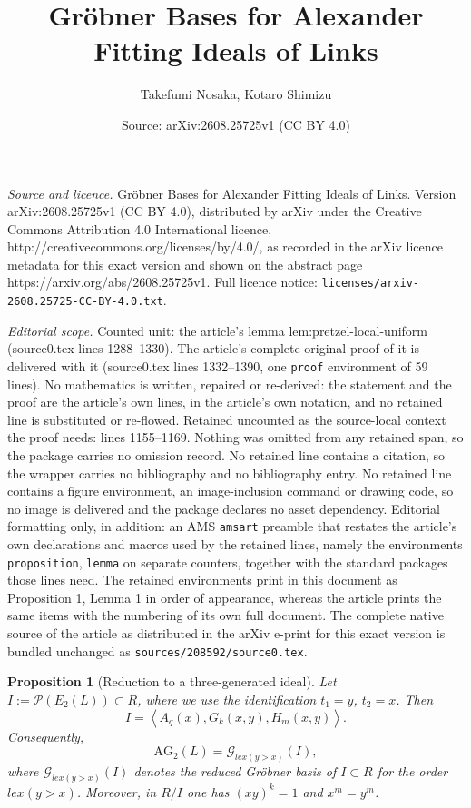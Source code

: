 \documentclass[10pt,a4paper]{amsart}
\title{Gr\"obner Bases for Alexander Fitting Ideals of Links}
\author{Takefumi Nosaka, Kotaro Shimizu}
\date{Source: arXiv:2608.25725v1 (CC BY 4.0)}
\newtheorem{proposition}{Proposition}
\newcommand{\AG}{\mathrm{AG}}
\newcommand{\PP}{\mathcal{P}}
\newcommand{\ideal}[1]{\left\langle #1 \right\rangle}
\newcommand{\lex}{lex}
\begin{document}
\maketitle

\noindent\emph{Source and licence.} Gr\"obner Bases for Alexander Fitting Ideals of Links. Version arXiv:2608.25725v1 (CC BY 4.0), distributed by arXiv under the Creative Commons Attribution 4.0 International licence, http://creativecommons.org/licenses/by/4.0/, as recorded in the arXiv licence metadata for this exact version and shown on the abstract page https://arxiv.org/abs/2608.25725v1. Full licence notice: \texttt{licenses/arxiv-2608.25725-CC-BY-4.0.txt}.\par\smallskip

\noindent\textit{Editorial scope.} Counted unit: the article's lemma lem:pretzel-local-uniform (source0.tex lines 1288--1330). The article's complete original proof of it is delivered with it (source0.tex lines 1332--1390, one \texttt{proof} environment of 59 lines). No mathematics is written, repaired or re-derived: the statement and the proof are the article's own lines, in the article's own notation, and no retained line is substituted or re-flowed.  Retained uncounted as the source-local context the proof needs: lines 1155--1169.  Nothing was omitted from any retained span, so the package carries no omission record.  No retained line contains a citation, so the wrapper carries no bibliography and no bibliography entry.  No retained line contains a figure environment, an image-inclusion command or drawing code, so no image is delivered and the package declares no asset dependency.  Editorial formatting only, in addition: an AMS \texttt{amsart} preamble that restates the article's own declarations and macros used by the retained lines, namely the environments \texttt{proposition}, \texttt{lemma} on separate counters, together with the standard packages those lines need.  The retained environments print in this document as Proposition 1, Lemma 1 in order of appearance, whereas the article prints the same items with the numbering of its own full document.  The complete native source of the article as distributed in the arXiv e-print for this exact version is bundled unchanged as \texttt{sources/208592/source0.tex}.
\begin{proposition}[Reduction to a three-generated ideal]
\label{prop:pretzel-reduction}
Let \(I:=\PP(E_2(L))\subset R\), where we use the identification
\(t_1=y\), \(t_2=x\).  Then
\[
I=\ideal{A_q(x),G_k(x,y),H_m(x,y)}.
\]
Consequently,
\[
\AG_2(L)=\mathcal G_{\lex(y>x)}(I),
\]
where \(\mathcal G_{\lex(y>x)}(I)\) denotes the reduced Gr\"obner basis of
\(I\subset R\) for the order \(\lex(y>x)\).  Moreover, in \(R/I\) one has
\((xy)^k=1\) and \(x^m=y^m\).
\end{proposition}
\end{document}
